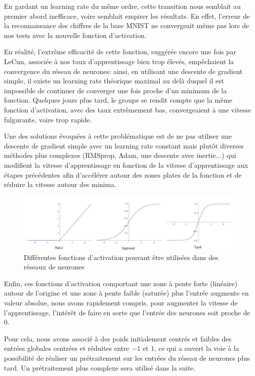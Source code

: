 \documentclass[
    10pt,
    a4paper,
    oneside,
    headinclude,footinclude,
    BCOR=5mm,
    captions=tableabove
]{scrartcl}
\begin{document}
En gardant un learning rate du même ordre, cette transition nous semblait au premier abord inefficace, voire semblait empirer les résultats. En effet, l'erreur de la reconnaissance des chiffres de la base MNIST ne convergeait même pas lors de nos tests avec la nouvelle fonction d'activation. 

En réalité, l'extrême efficacité de cette fonction, suggérée encore une fois par LeCun, associée à nos taux d'apprentissage bien trop élevés, empêchaient la convergence du réseau de neurones: ainsi, en utilisant une descente de gradient simple, il existe un learning rate théorique maximal au delà duquel il est impossible de continuer de converger une fois proche d'un minimum de la fonction. 
Quelques jours plus tard, le groupe se rendit compte que la même fonction d'activation, avec des taux extrêmement bas, convergeaient à une vitesse fulgurante, voire trop rapide. %

Une des solutions évoquées à cette problématique est de ne pas utiliser une descente de gradient simple avec un learning rate constant mais plutôt diverses méthodes plus complexes (RMSprop, Adam, une descente avec inertie...) qui modifient la vitesse d'apprentissage en fonction de la vitesse d'apprentissage aux étapes précédentes afin d'accélérer autour des zones plates de la fonction et de réduire la vitesse autour des minima.

\begin{figure}[h!]
\includegraphics[width=\linewidth]{activations.PNG}
\centering
\caption{Différentes fonctions d'activation pouvant être utilisées dans des réseaux de neurones }
\label{fig:activations.PNG}
\end{figure}

Enfin, ces fonctions d'activation comportant une zone à pente forte (linéaire) autour de l'origine et une zone à pente faible (saturée) plus l'entrée augmente en valeur absolue, nous avons rapidement compris, pour augmenter la vitesse de l'apprentissage, l'intérêt de faire en sorte que l'entrée des neurones soit proche de $0$. 

Pour cela, nous avons associé à des poids initialement centrés et faibles des entrées globales centrées et réduites entre $-1$ et $1$, ce qui a ouvert la voie à la possibilité de réaliser un prétraitement sur les entrées du réseau de neurones plus tard. Un prétraitement plus complexe sera utilisé dans la suite. 
\end{document}
